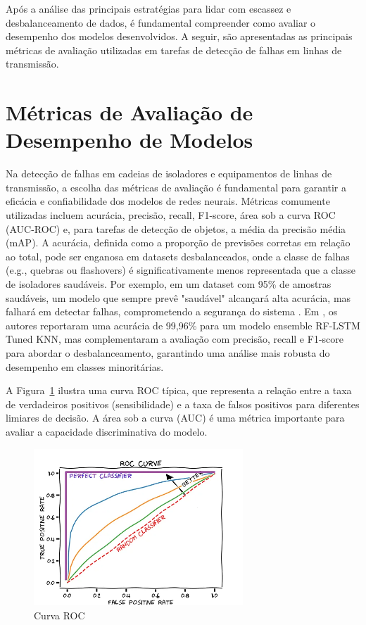 Após a análise das principais estratégias para lidar com escassez e desbalanceamento de dados, é fundamental compreender como avaliar o desempenho dos modelos desenvolvidos. A seguir, são apresentadas as principais métricas de avaliação utilizadas em tarefas de detecção de falhas em linhas de transmissão.

\section{Métricas de Avaliação de Desempenho de Modelos}

Na detecção de falhas em cadeias de isoladores e equipamentos de linhas de transmissão, a escolha das métricas de avaliação é fundamental para garantir a eficácia e confiabilidade dos modelos de redes neurais. Métricas comumente utilizadas incluem acurácia, precisão, recall, F1-score, área sob a curva ROC (AUC-ROC) e, para tarefas de detecção de objetos, a média da precisão média (mAP). A acurácia, definida como a proporção de previsões corretas em relação ao total, pode ser enganosa em datasets desbalanceados, onde a classe de falhas (e.g., quebras ou flashovers) é significativamente menos representada que a classe de isoladores saudáveis. Por exemplo, em um dataset com 95\% de amostras saudáveis, um modelo que sempre prevê "saudável" alcançará alta acurácia, mas falhará em detectar falhas, comprometendo a segurança do sistema \cite{he2009learning}. Em , os autores reportaram uma acurácia de 99,96\% para um modelo ensemble RF-LSTM Tuned KNN, mas complementaram a avaliação com precisão, recall e F1-score para abordar o desbalanceamento, garantindo uma análise mais robusta do desempenho em classes minoritárias.

A Figura~\ref{fig:roc_curve} ilustra uma curva ROC típica, que representa a relação entre a taxa de verdadeiros positivos (sensibilidade) e a taxa de falsos positivos para diferentes limiares de decisão. A área sob a curva (AUC) é uma métrica importante para avaliar a capacidade discriminativa do modelo.

\begin{figure}[H]
    \centering
    \caption{\label{fig:roc_curve}Curva ROC}
    \includegraphics[width=0.7\textwidth]{img/revisao_bibliografica/curva_roc.png}
\end{figure}

